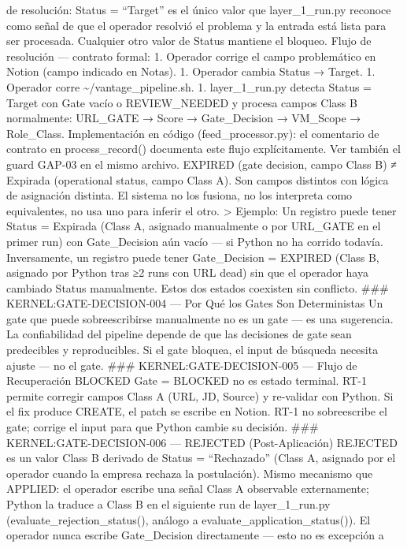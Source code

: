 \documentclass[
]{article}
\begin{document}
de resolución: Status = ``Target'' es el único valor que
layer\_1\_run.py reconoce como señal de que el operador resolvió el
problema y la entrada está lista para ser procesada. Cualquier otro
valor de Status mantiene el bloqueo. Flujo de resolución --- contrato
formal: 1. Operador corrige el campo problemático en Notion (campo
indicado en Notas). 1. Operador cambia Status → Target. 1. Operador
corre \textasciitilde/vantage\_pipeline.sh. 1. layer\_1\_run.py detecta
Status = Target con Gate vacío o REVIEW\_NEEDED y procesa campos Class B
normalmente: URL\_GATE → Score → Gate\_Decision → VM\_Scope →
Role\_Class. Implementación en código (feed\_processor.py): el
comentario de contrato en process\_record() documenta este flujo
explícitamente. Ver también el guard GAP-03 en el mismo archivo. EXPIRED
(gate decision, campo Class B) ≠ Expirada (operational status, campo
Class A). Son campos distintos con lógica de asignación distinta. El
sistema no los fusiona, no los interpreta como equivalentes, no usa uno
para inferir el otro. \textgreater{} Ejemplo: Un registro puede tener
Status = Expirada (Class A, asignado manualmente o por URL\_GATE en el
primer run) con Gate\_Decision aún vacío --- si Python no ha corrido
todavía. Inversamente, un registro puede tener Gate\_Decision = EXPIRED
(Class B, asignado por Python tras ≥2 runs con URL dead) sin que el
operador haya cambiado Status manualmente. Estos dos estados coexisten
sin conflicto. \#\#\# KERNEL:GATE-DECISION-004 --- Por Qué los Gates Son
Deterministas Un gate que puede sobreescribirse manualmente no es un
gate --- es una sugerencia. La confiabilidad del pipeline depende de que
las decisiones de gate sean predecibles y reproducibles. Si el gate
bloquea, el input de búsqueda necesita ajuste --- no el gate. \#\#\#
KERNEL:GATE-DECISION-005 --- Flujo de Recuperación BLOCKED Gate =
BLOCKED no es estado terminal. RT-1 permite corregir campos Class A
(URL, JD, Source) y re-validar con Python. Si el fix produce CREATE, el
patch se escribe en Notion. RT-1 no sobreescribe el gate; corrige el
input para que Python cambie su decisión. \#\#\#
KERNEL:GATE-DECISION-006 --- REJECTED (Post-Aplicación) REJECTED es un
valor Class B derivado de Status = ``Rechazado'' (Class A, asignado por
el operador cuando la empresa rechaza la postulación). Mismo mecanismo
que APPLIED: el operador escribe una señal Class A observable
externamente; Python la traduce a Class B en el siguiente run de
layer\_1\_run.py (evaluate\_rejection\_status(), análogo a
evaluate\_application\_status()). El operador nunca escribe
Gate\_Decision directamente --- esto no es excepción a
\end{document}
